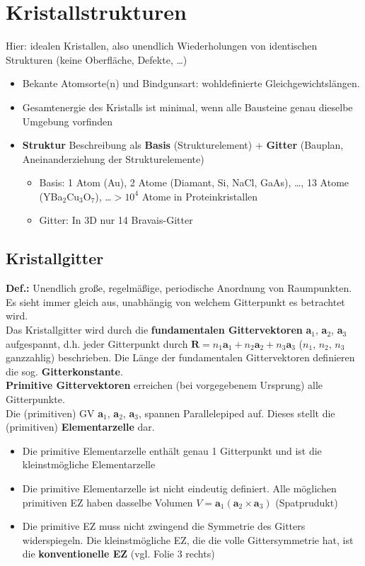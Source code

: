 \section{Kristallstrukturen} \label{kap:2}
Hier: idealen Kristallen, also unendlich Wiederholungen von identischen Strukturen (keine Oberfläche, Defekte, \dots)
\begin{itemize}
    \item Bekante Atomsorte(n) und Bindgunsart: wohldefinierte Gleichgewichtslängen.
    \item Gesamtenergie des Kristalls ist minimal, wenn alle Bausteine genau dieselbe Umgebung vorfinden
    \item \textbf{Struktur} Beschreibung als \textbf{Basis} (Strukturelement) + \textbf{Gitter} (Bauplan, Aneinanderziehung der Strukturelemente)
          \begin{itemize}
              \item Basis: 1 Atom (Au), 2 Atome (Diamant, Si, NaCl, GaAs), \dots, 13 Atome (YBa$_2$Cu$_3$O$_7$), \dots $>10^4$ Atome in Proteinkristallen
              \item Gitter: In 3D nur 14 Bravais-Gitter
          \end{itemize}
\end{itemize}

\subsection{Kristallgitter} \label{kap:2_1}
\textbf{Def.:} Unendlich große, regelmäßige, periodische Anordnung von Raumpunkten. Es sieht immer gleich aus, unabhängig von welchem Gitterpunkt es betrachtet wird.\\
Das Kristallgitter wird durch die \textbf{fundamentalen Gittervektoren} \textbf{a$_1$}, \textbf{a$_2$}, \textbf{a$_3$} aufgespannt, d.h. jeder Gitterpunkt durch $\textbf{R} = n_1 \textbf{a}_1 + n_2 \textbf{a}_2 +n_3 \textbf{a}_3$ ($n_1$, $n_2$, $n_3$ ganzzahlig) beschrieben. Die Länge der fundamentalen Gittervektoren definieren die sog. \textbf{Gitterkonstante}.\\
\textbf{Primitive Gittervektoren} erreichen (bei vorgegebenem Ursprung) alle Gitterpunkte.\\
Die (primitiven) GV \textbf{a$_1$}, \textbf{a$_2$}, \textbf{a$_3$}, spannen Parallelepiped auf. Dieses stellt die (primitiven) \textbf{Elementarzelle} dar.\\
\begin{itemize}
    \item Die primitive Elementarzelle enthält genau 1 Gitterpunkt und ist die kleinstmögliche Elementarzelle
    \item Die primitive Elementarzelle ist nicht eindeutig definiert. Alle möglichen primitiven EZ haben dasselbe Volumen $V = \textbf{a}_1 (\textbf{a}_2 \times \textbf{a}_3)$ (Spatprudukt)
    \item Die primitive EZ muss nicht zwingend die Symmetrie des Gitters widerspiegeln. Die kleinstmögliche EZ, die die volle Gittersymmetrie hat, ist die \textbf{konventionelle EZ} (vgl. Folie 3 rechts)
\end{itemize}
